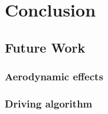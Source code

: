 \chapter{Conclusion}
\label{chap:conclusion}


\section{Future Work}
\label{sec:future}
\subsection{Aerodynamic effects}
\subsection{Driving algorithm}
